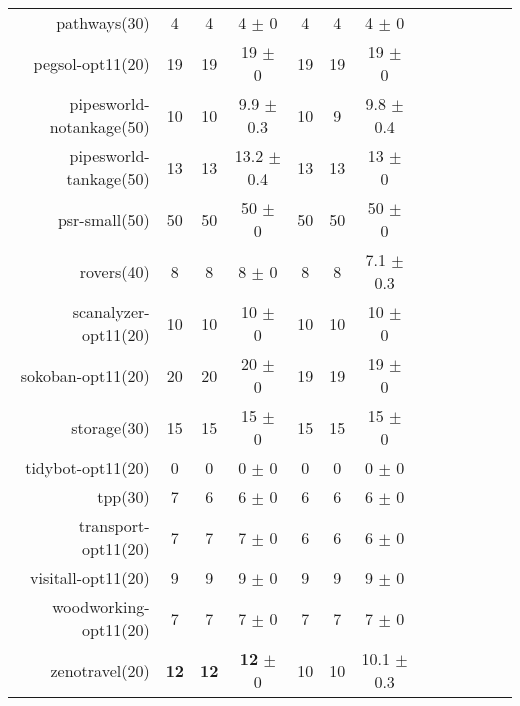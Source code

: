 \begin{center}
\begin{tabular}{|r|*{4}{ccc|}}
pathways(30) & 4 & 4 & 4 \(\pm\) 0 & 4 & 4 & 4 \(\pm\) 0\\
pegsol-opt11(20) & 19 & 19 & 19 \(\pm\) 0 & 19 & 19 & 19 \(\pm\) 0\\
pipesworld-notankage(50) & 10 & 10 & 9.9 \(\pm\) 0.3 & 10 & 9 & 9.8 \(\pm\) 0.4\\
pipesworld-tankage(50) & 13 & 13 & 13.2 \(\pm\) 0.4 & 13 & 13 & 13 \(\pm\) 0\\
psr-small(50) & 50 & 50 & 50 \(\pm\) 0 & 50 & 50 & 50 \(\pm\) 0\\
rovers(40) & 8 & 8 & 8 \(\pm\) 0 & 8 & 8 & 7.1 \(\pm\) 0.3\\
scanalyzer-opt11(20) & 10 & 10 & 10 \(\pm\) 0 & 10 & 10 & 10 \(\pm\) 0\\
sokoban-opt11(20) & 20 & 20 & 20 \(\pm\) 0 & 19 & 19 & 19 \(\pm\) 0\\
storage(30) & 15 & 15 & 15 \(\pm\) 0 & 15 & 15 & 15 \(\pm\) 0\\
tidybot-opt11(20) & 0 & 0 & 0 \(\pm\) 0 & 0 & 0 & 0 \(\pm\) 0\\
tpp(30) & 7 & 6 & 6 \(\pm\) 0 & 6 & 6 & 6 \(\pm\) 0\\
transport-opt11(20) & 7 & 7 & 7 \(\pm\) 0 & 6 & 6 & 6 \(\pm\) 0\\
visitall-opt11(20) & 9 & 9 & 9 \(\pm\) 0 & 9 & 9 & 9 \(\pm\) 0\\
woodworking-opt11(20) & 7 & 7 & 7 \(\pm\) 0 & 7 & 7 & 7 \(\pm\) 0\\
zenotravel(20) & \textbf{12} & \textbf{12} & \textbf{12} \(\pm\) 0 & 10 & 10 & 10.1 \(\pm\) 0.3\\
\end{tabular}
\end{center}
